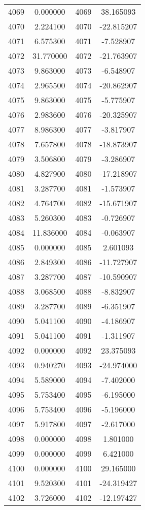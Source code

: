 \documentclass[12pt]{article}
\begin{document}
\begin{longtable}{@{}cccc@{}}
4069 & 0.000000 & 4069 & 38.165093 \\
4070 & 2.224100 & 4070 & -22.815207 \\
4071 & 6.575300 & 4071 & -7.528907 \\
4072 & 31.770000 & 4072 & -21.763907 \\
4073 & 9.863000 & 4073 & -6.548907 \\
4074 & 2.965500 & 4074 & -20.862907 \\
4075 & 9.863000 & 4075 & -5.775907 \\
4076 & 2.983600 & 4076 & -20.325907 \\
4077 & 8.986300 & 4077 & -3.817907 \\
4078 & 7.657800 & 4078 & -18.873907 \\
4079 & 3.506800 & 4079 & -3.286907 \\
4080 & 4.827900 & 4080 & -17.218907 \\
4081 & 3.287700 & 4081 & -1.573907 \\
4082 & 4.764700 & 4082 & -15.671907 \\
4083 & 5.260300 & 4083 & -0.726907 \\
4084 & 11.836000 & 4084 & -0.063907 \\
4085 & 0.000000 & 4085 & 2.601093 \\
4086 & 2.849300 & 4086 & -11.727907 \\
4087 & 3.287700 & 4087 & -10.590907 \\
4088 & 3.068500 & 4088 & -8.832907 \\
4089 & 3.287700 & 4089 & -6.351907 \\
4090 & 5.041100 & 4090 & -4.186907 \\
4091 & 5.041100 & 4091 & -1.311907 \\
4092 & 0.000000 & 4092 & 23.375093 \\
4093 & 0.940270 & 4093 & -24.974000 \\
4094 & 5.589000 & 4094 & -7.402000 \\
4095 & 5.753400 & 4095 & -6.195000 \\
4096 & 5.753400 & 4096 & -5.196000 \\
4097 & 5.917800 & 4097 & -2.617000 \\
4098 & 0.000000 & 4098 & 1.801000 \\
4099 & 0.000000 & 4099 & 6.421000 \\
4100 & 0.000000 & 4100 & 29.165000 \\
4101 & 9.520300 & 4101 & -24.319427 \\
4102 & 3.726000 & 4102 & -12.197427 \\

\end{longtable}
\end{document}
